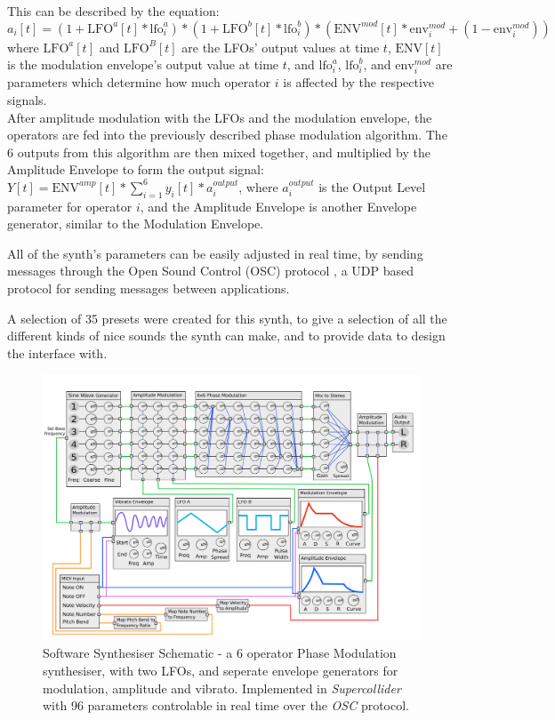 \documentclass[11pt, oneside]{report}   	%
\begin{document}
This can be described by the equation:
 \begin{equation}
 	a_i[t] = (1 + \mathrm{LFO}^a[t]*\mathrm{lfo}^{a}_i)*(1 + \mathrm{LFO}^b[t]*\mathrm{lfo}^{b}_i)*(\mathrm{ENV}^{mod}[t]*\mathrm{env}^{mod}_i + (1-\mathrm{env}^{mod}_i))
 \end{equation}
where $\mathrm{LFO}^a[t]$ and $\mathrm{LFO}^B[t]$ are the LFOs' output values at time $t$, $\mathrm{ENV}[t]$ is the modulation envelope's output value at time $t$, and $\mathrm{lfo}^{a}_i$, $\mathrm{lfo}^{b}_i$, and $\mathrm{env}^{mod}_{i}$ are parameters which determine how much operator $i$ is affected by the respective signals.\\
After amplitude modulation with the LFOs and the modulation envelope, the operators are fed into the previously described phase modulation algorithm. The 6 outputs from this algorithm are then mixed together, and multiplied by the Amplitude Envelope to form the output signal: $Y[t] = \mathrm{ENV}^{amp}[t]*\sum_{i=1}^{6}y_i[t]*a_i^{output}$, where $a_i^{output}$ is the Output Level parameter for operator $i$, and the Amplitude Envelope is another Envelope generator, similar to the Modulation Envelope.

All of the synth's parameters can be easily adjusted in real time, by sending messages through the Open Sound Control (OSC) protocol \cite{OSC}, a UDP based protocol for sending messages between applications.

A selection of 35 presets were created for this synth, to give a selection of all the different kinds of nice sounds the synth can make, and to provide data to design the interface with.
\begin{figure}[h] \label{fig:SynthSchematic}
	\centering
	\hspace*{-2cm}
	\includegraphics[width = 7.8in]{SynthSchematic.png}
	\caption{Software Synthesiser Schematic - a 6 operator Phase Modulation synthesiser, with two LFOs, and seperate envelope generators for modulation, amplitude and vibrato. Implemented in \emph{Supercollider} with 96 parameters controlable in real time over the \emph{OSC} protocol.}
\end{figure}
\end{document}

